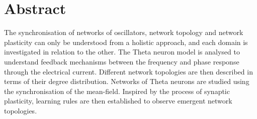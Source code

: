 \newpage
\section*{Abstract}
The synchronisation of networks of oscillators, network topology and network plasticity can only be understood from a holistic approach, and each domain is investigated in relation to the other. The Theta neuron model is analysed to understand feedback mechanisms between the frequency and phase response through the electrical current. Different network topologies are then described in terms of their degree distribution. Networks of Theta neurons are studied using the synchronisation of the mean-field. Inspired by the process of synaptic plasticity, learning rules are then established to observe emergent network topologies. 


